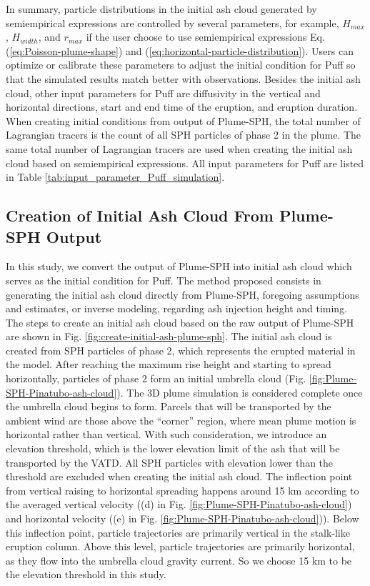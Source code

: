 \documentclass[utf8]{frontiersSCNS} %
\begin{document}
In summary, particle distributions in the initial ash cloud generated by semiempirical expressions are controlled by several parameters, for example, $H_{max}$, $H_{width}$, and $r_{max}$ if the user choose to use  semiempirical expressions Eq. (\ref{eq:Poisson-plume-shape}) and (\ref{eq:horizontal-particle-distribution}). Users can optimize or calibrate these parameters to adjust the initial condition for Puff so that the simulated results match better with observations. 
Besides the initial ash cloud, other input parameters for Puff are diffusivity in the vertical and horizontal directions, start and end time of the eruption, and eruption duration. When creating initial conditions from output of Plume-SPH, the total number of Lagrangian tracers is the count of all SPH particles of phase 2 in the plume. The same total number of Lagrangian tracers are used when creating the initial ash cloud based on semiempirical expressions. All input parameters for Puff are listed in Table \ref{tab:input_parameter_Puff_simulation}.

\subsection{Creation of Initial Ash Cloud From Plume-SPH Output} \label{sec:create-initial-condition}
In this study, we convert the output of Plume-SPH into initial ash cloud which serves as the initial condition for Puff. The method proposed consists in generating the initial ash cloud directly from Plume-SPH, foregoing assumptions and estimates, or inverse modeling, regarding ash injection height and timing.
The steps to create an initial ash cloud based on the raw output of Plume-SPH are shown in Fig. \ref{fig:create-initial-ash-plume-sph}.
The initial ash cloud is created from SPH particles of phase 2, which represents the erupted material in the model. After reaching the maximum rise height and starting to spread horizontally, particles of phase 2 form an initial umbrella cloud (Fig. \ref{fig:Plume-SPH-Pinatubo-ash-cloud}). The 3D plume simulation is considered complete once the umbrella cloud begins to form. Parcels that will be transported by the ambient wind are those above the ``corner'' region, where mean plume motion is horizontal rather than vertical. With such consideration, we introduce an elevation threshold, which is the lower elevation limit of the ash that will be transported by the VATD. All SPH particles with elevation lower than the threshold are excluded when creating the initial ash cloud. The inflection point from vertical raising to horizontal spreading happens around 15 km according to the averaged vertical velocity ((d) in Fig. \ref{fig:Plume-SPH-Pinatubo-ash-cloud}) and horizontal velocity  ((e) in Fig. \ref{fig:Plume-SPH-Pinatubo-ash-cloud})).  Below this inflection point, particle trajectories are primarily vertical in the stalk-like eruption column. Above this level, particle trajectories are primarily horizontal, as they flow into the umbrella cloud gravity current. So we choose 15 km to be the elevation threshold in this study.
\end{document}
